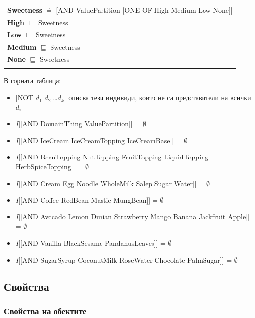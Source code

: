 \documentclass[12pt]{article}
\begin{document}
\begin{tabularx}{1\textwidth}{@{}X@{}}
            \textbf{Sweetness} $\doteq$ [AND ValuePartition [ONE-OF High Medium Low None]] \\            
            \textbf{High} $\sqsubseteq$ Sweetness \\
            \textbf{Low} $\sqsubseteq$ Sweetness \\
            \textbf{Medium} $\sqsubseteq$ Sweetness \\
            \textbf{None} $\sqsubseteq$ Sweetness \\
            \tabularnewline

        \bottomrule
        \end{tabularx}


    В горната таблица:

        \begin{itemize} 
            \item{} [NOT $d_1$ $d_2$ \ldots $d_k$] описва тези индивиди, които не са представители на всички $d_i$
            \item{} \textit{I}[[AND DomainThing ValuePartition]] = $\emptyset$
            \item{} \textit{I}[[AND IceCream IceCreamTopping IceCreamBase]] = $\emptyset$
            \item{} \textit{I}[[AND BeanTopping NutTopping FruitTopping LiquidTopping HerbSpiceTopping]] = $\emptyset$
            \item{} \textit{I}[[AND Cream Egg Noodle WholeMilk Salep Sugar Water]] = $\emptyset$
            \item{} \textit{I}[[AND Coffee RedBean Mastic MungBean]] = $\emptyset$
            \item{} \textit{I}[[AND Avocado Lemon Durian Strawberry Mango Banana Jackfruit Apple]] = $\emptyset$
            \item{} \textit{I}[[AND Vanilla BlackSesame PandanusLeaves]] = $\emptyset$
            \item{} \textit{I}[[AND SugarSyrup CoconutMilk RoseWater Chocolate PalmSugar]] = $\emptyset$
        \end{itemize}
    
    \subsection{Свойства}
    
    \subsubsection{Свойства на обектите}
    
\end{document}
